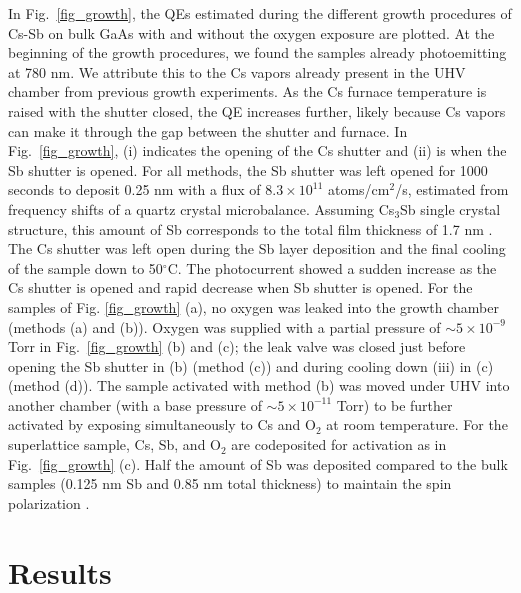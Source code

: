 In Fig.~\ref{fig_growth}, the QEs estimated during the different growth procedures of Cs-Sb on bulk GaAs with and without  the oxygen exposure are plotted.  
At the beginning of the growth procedures, we found the samples already photoemitting at 780 nm. We attribute this to the Cs vapors already present in the UHV chamber from previous growth experiments. As the Cs furnace temperature is raised with the shutter closed, the QE increases further, likely because Cs vapors can make it through the gap between the shutter and furnace. In Fig.~\ref{fig_growth}, (i) indicates the opening of the Cs shutter and (ii) is when the Sb shutter is opened. For all methods, the Sb shutter was left opened for 1000 seconds to deposit 0.25 nm with a flux of $8.3 \times 10^{11}$ atoms/cm$^2$/s, estimated from frequency shifts of a quartz crystal microbalance. Assuming Cs$_3$Sb single crystal structure, this amount of Sb corresponds to the total film thickness of 1.7 nm \cite{hagino1966}. The Cs shutter was left open during the Sb layer deposition and the final cooling of the sample down to 50$^\circ$C. The photocurrent showed a sudden increase as the Cs shutter is opened and rapid decrease when Sb shutter is opened. 
For the samples of Fig. \ref{fig_growth} (a), no oxygen was leaked into the growth chamber (methods (a) and (b)). Oxygen was supplied with a partial pressure of $\sim 5 \times 10^{-9}$ Torr  in Fig.~\ref{fig_growth} (b) and (c); the leak valve was closed just before opening the Sb shutter in (b) (method (c)) and during cooling down (iii) in (c) (method (d)). %
The sample activated with method (b) was moved under UHV into another chamber (with a base pressure of $\sim 5 \times 10^{-11}$ Torr) to be further activated by exposing simultaneously to Cs and O$_2$ at room temperature. For the superlattice sample, Cs, Sb, and O$_2$ are codeposited for activation as in Fig.~\ref{fig_growth} (c).
Half the amount of Sb was deposited compared to the bulk samples (0.125 nm Sb and 0.85 nm total thickness) to maintain the spin polarization \cite{cultrera2020_LongLifetimePolarized}.

\section{Results}


